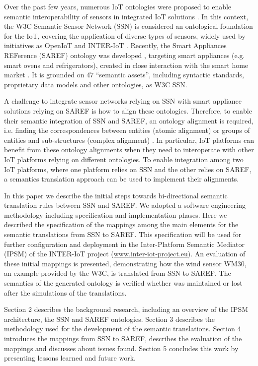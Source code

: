 \documentclass{sig-alternate-05-2015}
\begin{document}
Over the past few years, numerous IoT ontologies were proposed to enable semantic interoperability of sensors in integrated IoT solutions \cite{Ganzha2016a}. In this context, the W3C Semantic Sensor Network (SSN) is considered an ontological foundation for the IoT, covering the application of diverse types of sensors, widely used by initiatives as OpenIoT and INTER-IoT \cite{Ganzha2017a}. 
Recently, the Smart Appliances REFerence (SAREF) ontology was developed \cite{Daniele2015}, targeting smart appliances (e.g. smart ovens and refrigerators), created in close interaction with the smart home market \cite{Daniele2016}. It is grounded on 47 “semantic assets”, including syntactic standards, proprietary data models and other ontologies, as W3C SSN. 

A challenge to integrate sensor networks relying on SSN with smart appliance solutions relying on SAREF is how to align these ontologies. Therefore, to enable their semantic integration of SSN and SAREF, an ontology alignment is required, i.e. finding the correspondences between entities (atomic alignment) or groups of entities and sub-structures (complex alignment) \cite{Ganzha2015}. In particular, IoT platforms can benefit from these ontology alignments when they need to interoperate with other IoT platforms relying on different ontologies. To enable integration among two IoT platforms, where one platform relies on SSN and the other relies on SAREF, a semantics translation approach can be used to implement their alignments.

In this paper we describe the initial steps towards bi-directional semantic translation rules between SSN and SAREF. We adopted a software engineering methodology including specification and implementation phases. Here we described the specification of the mappings among the main elements for the semantic translations from SSN to SAREF. This specification will be used for further configuration and deployment in the Inter-Platform Semantic Mediator (IPSM) of the INTER-IoT project (\url{www.inter-iot-project.eu}). An evaluation of these initial mappings is presented, demonstrating how the wind sensor WM30, an example provided by the W3C, is translated from SSN to SAREF. The semantics of the generated ontology is verified whether was maintained or lost after the simulations of the translations. 

Section 2 describes the background research, including an overview of the IPSM architecture, the SSN and SAREF ontologies. Section 3 describes the methodology used for the development of the semantic translations. Section 4 introduces the mappings from SSN to SAREF, describes the evaluation of the mappings and discusses about issues found. Section 5 concludes this work by presenting lessons learned and future work. 
\end{document}
